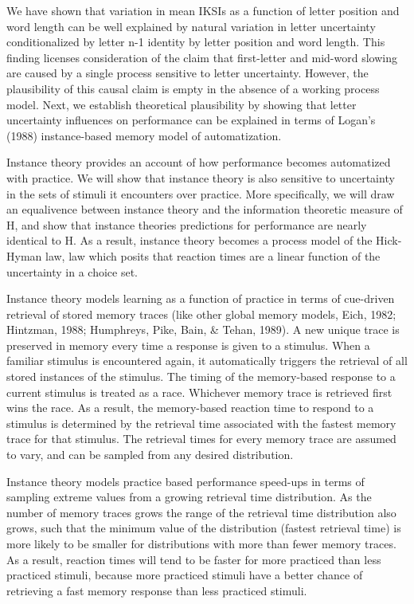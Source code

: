 \documentclass[floatsintext,man]{apa6}
\theoremstyle{definition}
\theoremstyle{definition}
\theoremstyle{definition}
\theoremstyle{remark}
\begin{document}
We have shown that variation in mean IKSIs as a function of letter
position and word length can be well explained by natural variation in
letter uncertainty conditionalized by letter n-1 identity by letter
position and word length. This finding licenses consideration of the
claim that first-letter and mid-word slowing are caused by a single
process sensitive to letter uncertainty. However, the plausibility of
this causal claim is empty in the absence of a working process model.
Next, we establish theoretical plausibility by showing that letter
uncertainty influences on performance can be explained in terms of
Logan's (1988) instance-based memory model of automatization.

Instance theory provides an account of how performance becomes
automatized with practice. We will show that instance theory is also
sensitive to uncertainty in the sets of stimuli it encounters over
practice. More specifically, we will draw an equalivence between
instance theory and the information theoretic measure of H, and show
that instance theories predictions for performance are nearly identical
to H. As a result, instance theory becomes a process model of the
Hick-Hyman law, law which posits that reaction times are a linear
function of the uncertainty in a choice set.

Instance theory models learning as a function of practice in terms of
cue-driven retrieval of stored memory traces (like other global memory
models, Eich, 1982; Hintzman, 1988; Humphreys, Pike, Bain, \& Tehan,
1989). A new unique trace is preserved in memory every time a response
is given to a stimulus. When a familiar stimulus is encountered again,
it automatically triggers the retrieval of all stored instances of the
stimulus. The timing of the memory-based response to a current stimulus
is treated as a race. Whichever memory trace is retrieved first wins the
race. As a result, the memory-based reaction time to respond to a
stimulus is determined by the retrieval time associated with the fastest
memory trace for that stimulus. The retrieval times for every memory
trace are assumed to vary, and can be sampled from any desired
distribution.

Instance theory models practice based performance speed-ups in terms of
sampling extreme values from a growing retrieval time distribution. As
the number of memory traces grows the range of the retrieval time
distribution also grows, such that the minimum value of the distribution
(fastest retrieval time) is more likely to be smaller for distributions
with more than fewer memory traces. As a result, reaction times will
tend to be faster for more practiced than less practiced stimuli,
because more practiced stimuli have a better chance of retrieving a fast
memory response than less practiced stimuli.
\end{document}
